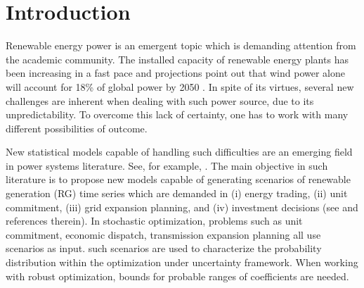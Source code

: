 \section{Introduction} \label{sec:introduction}


Renewable energy power is an emergent topic which is demanding attention from the academic community. %
The installed capacity of renewable energy plants has been increasing in a fast pace and projections point out that wind power alone will account for 18\% of global power by 2050 \cite{IntEnerAgency}.
In spite of its virtues, several new challenges are inherent when dealing with such power source, due to its unpredictability. To overcome this lack of certainty, one has to work with many different possibilities of outcome.

New statistical models capable of handling such difficulties are an emerging field in power systems literature. See, for example, \cite{bessa2012time, gallego2016line,moller_time-adaptive_2008,nielsen2006,bremnes_probabilistic_2004,wan_direct_2017}. 
The main objective in such literature is to propose new models capable of generating scenarios of renewable generation (RG) time series which are demanded in (i) energy trading, (ii) unit commitment, (iii) grid expansion planning, and (iv) investment decisions (see \cite{moreiraStreet,jabr2013robust,zhaoguan,Aderson2017} and references therein). 
In stochastic optimization, problems such as unit commitment, economic dispatch, transmission expansion planning all use scenarios as input. 
such scenarios are used to characterize the probability distribution within the optimization under uncertainty framework.
When working with robust optimization, bounds for probable ranges of coefficients are needed.

 
